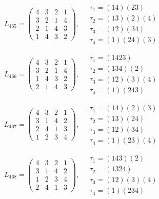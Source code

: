 $L_{465} = \begin{pmatrix} 4 & 3 & 2 & 1 \\ 3 & 2 & 1 & 4 \\ 2 & 1 & 4 & 3 \\ 1 & 4 & 3 & 2 \end{pmatrix}, \quad \begin{matrix} \tau_{1} = (1 4)(2 3) \\ \tau_{2} = (1 3)(2)(4) \\ \tau_{3} = (1 2)(3 4) \\ \tau_{4} = (1)(2 4)(3) \end{matrix}$

$L_{466} = \begin{pmatrix} 4 & 3 & 2 & 1 \\ 3 & 2 & 1 & 4 \\ 1 & 4 & 3 & 2 \\ 2 & 1 & 4 & 3 \end{pmatrix}, \quad \begin{matrix} \tau_{1} = (1 4 2 3) \\ \tau_{2} = (1 3 4)(2) \\ \tau_{3} = (1 2)(3)(4) \\ \tau_{4} = (1)(2 4 3) \end{matrix}$

$L_{467} = \begin{pmatrix} 4 & 3 & 2 & 1 \\ 3 & 1 & 4 & 2 \\ 2 & 4 & 1 & 3 \\ 1 & 2 & 3 & 4 \end{pmatrix}, \quad \begin{matrix} \tau_{1} = (1 4)(2)(3) \\ \tau_{2} = (1 3)(2 4) \\ \tau_{3} = (1 2)(3 4) \\ \tau_{4} = (1)(2 3)(4) \end{matrix}$

$L_{468} = \begin{pmatrix} 4 & 3 & 2 & 1 \\ 3 & 1 & 4 & 2 \\ 1 & 2 & 3 & 4 \\ 2 & 4 & 1 & 3 \end{pmatrix}, \quad \begin{matrix} \tau_{1} = (1 4 3)(2) \\ \tau_{2} = (1 3 2 4) \\ \tau_{3} = (1 2)(3)(4) \\ \tau_{4} = (1)(2 3 4) \end{matrix}$


